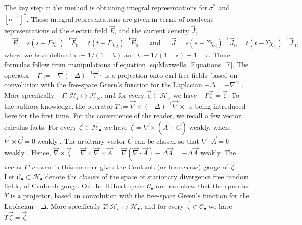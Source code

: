 \documentclass[english,12pt,jmp,graphicx]{revtex4-1}
\begin{document}
The key step in the method is obtaining integral representations for
$\sigma^*$ and $[\sigma^{-1}]^*$. These integral representations are given in
terms of resolvent representations of the electric field $\vec{E}$, and
the current density $\vec{J}$,    
%
\begin{align}\label{eq:Resolvent_representations_E_D}
  &\vec{E}=s(s+\Gamma\chi_1)^{-1}\vec{E}_0=t(t+\Gamma\chi_2)^{-1}\vec{E}_0 &&\text{and}
  &&\vec{J}=s(s-\Upsilon\chi_2)^{-1}\vec{J}_0=t(t-\Upsilon\chi_1)^{-1}\vec{J}_0,
\end{align}
%
where we have defined $s:=1/(1-h)$ and $t:=1/(1-z)=1-s$. These
formulas follow from manipulations of equation
\eqref{eq:Maxwells_Equations_E}. The operator
$-\Gamma:=-\vec{\nabla}(-\Delta)^{-1}\vec{\nabla}\cdot$ is a projection onto curl-free fields, 
based on convolution with the free-space Green's function for the
Laplacian $-\Delta=-\nabla^{\,2}$ \cite{Golden:CMP-473}. More specifically
$-\Gamma:\mathscr{H}_s\mapsto\mathscr{H}_\times$, and for every
$\vec{\zeta}\in\mathscr{H}_\times$ we have $-\Gamma\vec{\zeta}=\vec{\zeta}$. To the authors  
knowledge, the operator $\Upsilon:=\vec{\nabla}\times(-\Delta)^{-1}\vec{\nabla}\times$ is being
introduced here for the first time. For the convenience of the reader,
we recall a few vector calculus facts. For every
$\vec{\zeta}\in\mathscr{H}_\bullet$ we have $\vec{\zeta}=\vec{\nabla}\times(\vec{A}+\vec{C})$
weakly, where $\vec{\nabla}\times\vec{C}=0$ weakly \cite{Jackson-1999,Folland:95}. The
arbitrary vector $\vec{C}$ can be chosen so that $\vec{\nabla}\cdot\vec{A}=0$
weakly \cite{Jackson-1999}. Hence,
$\vec{\nabla}\times\vec{\zeta}=\vec{\nabla}\times\vec{\nabla}\times\vec{A}
=\vec{\nabla}(\vec{\nabla}\cdot\vec{A})-\Delta\vec{A}=-\Delta\vec{A}$ weakly. The vector
$\vec{C}$ chosen in this manner gives the Coulomb (or transverse)
gauge of $\vec{\zeta}$ \cite{Jackson-1999}. Let
$\mathscr{C}_{\bullet}\subset\mathscr{H}_{\bullet}$ denote the \emph{closure} of the
space of stationary divergence free random fields, of Coulomb gauge. On
the Hilbert space $\mathscr{C}_{\bullet}$ one can show that the
operator $\Upsilon$ is a projector, based on convolution with the
free-space Green's function for the Laplacian $-\Delta$. More specifically
$\Upsilon:\mathscr{H}_s\mapsto\mathscr{H}_\bullet$, and for every $\vec{\zeta}\in\mathscr{C}_\bullet$
we have $\Upsilon\vec{\zeta}=\vec{\zeta}$.  
\end{document}
